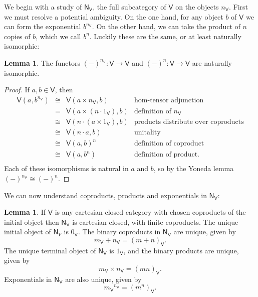 \documentclass{amsart}
\theoremstyle{definition}
\newtheorem{lemma}[theorem]{Lemma}
\newcommand{\NN}{\mathsf{N}}
\newcommand{\V}{\mathsf{V}}
\newcommand{\maps}{\colon}
\begin{document}
We begin with a study of $\NN_\V$, the full subcategory of $\V$ on the objects $n_\V$.
First we must resolve a potential ambiguity.  On the one hand,
for any object $b$ of $\V$ we can form the exponential $b^{n_\V}$.   On the 
other hand, we can take the product of $n$ copies of $b$, which we call $b^n$.    
Luckily these are the same, or at least naturally isomorphic:

\begin{lemma}
\label{lem:powers_1}
The functors $(-)^{n_\V} \maps \V\to \V$ and $(-)^n\maps \V\to \V$ are naturally isomorphic.  
\end{lemma}
\begin{proof}
If $a,b \in \V$, then
\[\begin{array}{rcll}
	\V(a,b^{n_\V}) & \cong & \V(a\times n_\V,b) & \text{hom-tensor adjunction}\\
	& = & \V(a\times (n \cdot 1_\V),b) & \text{definition of } n_\V\\ 
	& \cong & \V(n \cdot( a\times 1_\V), b) & \text{products distribute over coproducts}\\  
	& \cong & \V(n \cdot a,b) & \text{unitality}\\  
	& \cong & \V(a,b)^n & \text{definition of coproduct}\\
	& \cong & \V(a,b^n) & \text{definition of product}.\\
	\end{array}
\]
Each of these isomorphisms is natural in $a$ and $b$, so by the Yoneda lemma $(-)^{n_\V} \cong (-)^n$.
\end{proof}

We can now understand coproducts, products and exponentials in $\NN_\V$:

\begin{lemma}
\label{lem:NN}
If $\V$ is any cartesian closed category with chosen coproducts of the initial object then
$\NN_\V$ is cartesian closed, with finite coproducts.  The unique initial object of $\NN_V$
is $0_\V$.  The binary coproducts in $\NN_\V$ are unique, given by
\[     m_\V + n_\V = (m + n)_\V . \]
The unique terminal object of $\NN_\V$ is $1_\V$, and the binary products are unique, given by
\[      m_\V \times n_\V = (mn)_\V  .\]
Exponentials in $\NN_\V$ are also unique, given by 
\[     {m_\V}^{n_\V} = (m^n)_\V   .\]
\end{lemma}
\end{document}
